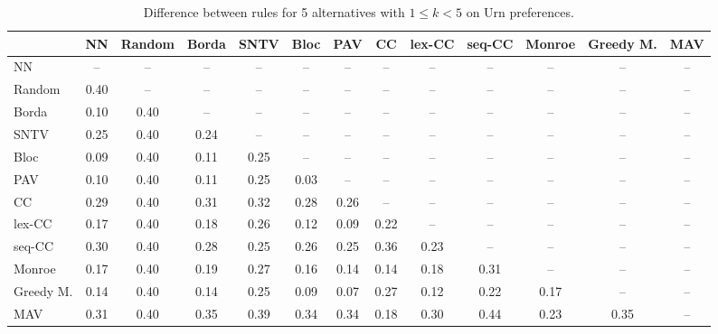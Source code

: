 
\begin{table*}[h!]
\centering
\begin{tabular}{lcccccccccccc}
\toprule
 & NN & Random & Borda & SNTV & Bloc & PAV & CC & lex-CC & seq-CC & Monroe & Greedy M. & MAV \\
\midrule
NN & -- & -- & -- & -- & -- & -- & -- & -- & -- & -- & -- & -- \\
Random & 0.40 & -- & -- & -- & -- & -- & -- & -- & -- & -- & -- & -- \\
Borda & 0.10 & 0.40 & -- & -- & -- & -- & -- & -- & -- & -- & -- & -- \\
SNTV & 0.25 & 0.40 & 0.24 & -- & -- & -- & -- & -- & -- & -- & -- & -- \\
Bloc & 0.09 & 0.40 & 0.11 & 0.25 & -- & -- & -- & -- & -- & -- & -- & -- \\
PAV & 0.10 & 0.40 & 0.11 & 0.25 & 0.03 & -- & -- & -- & -- & -- & -- & -- \\
CC & 0.29 & 0.40 & 0.31 & 0.32 & 0.28 & 0.26 & -- & -- & -- & -- & -- & -- \\
lex-CC & 0.17 & 0.40 & 0.18 & 0.26 & 0.12 & 0.09 & 0.22 & -- & -- & -- & -- & -- \\
seq-CC & 0.30 & 0.40 & 0.28 & 0.25 & 0.26 & 0.25 & 0.36 & 0.23 & -- & -- & -- & -- \\
Monroe & 0.17 & 0.40 & 0.19 & 0.27 & 0.16 & 0.14 & 0.14 & 0.18 & 0.31 & -- & -- & -- \\
Greedy M. & 0.14 & 0.40 & 0.14 & 0.25 & 0.09 & 0.07 & 0.27 & 0.12 & 0.22 & 0.17 & -- & -- \\
MAV & 0.31 & 0.40 & 0.35 & 0.39 & 0.34 & 0.34 & 0.18 & 0.30 & 0.44 & 0.23 & 0.35 & -- \\
\bottomrule
\end{tabular}

\caption{Difference between rules for 5 alternatives with $1 \leq k < 5$ on Urn preferences.}
\end{table*}
